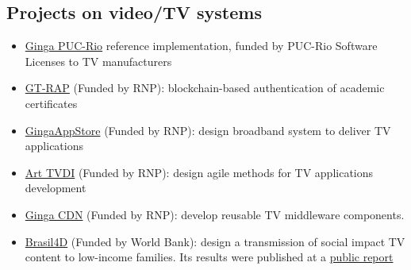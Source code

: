 \documentclass[10pt,a4paper,sans,colorlinks]{moderncv}
\begin{document}
  \subsection{Projects on video/TV systems}
    \begin{itemize}[mynosep]
      \item \href{https://github.com/TeleMidia/ginga}{Ginga PUC-Rio} reference implementation, funded by PUC-Rio Software Licenses to TV manufacturers
      \item \href{http://wrnp.rnp.br/sites/wrnp2017/files/02_wrnp2017_poster_gt-sap_design.pdf}{GT-RAP} (Funded by RNP): blockchain-based authentication of academic certificates
      \item \href{http://www.redetic.rnp.br/ctic/2019/01/29/ginga-appstore/}{GingaAppStore} (Funded by RNP): design broadband system to deliver TV applications
      \item \href{http://www.redetic.rnp.br/ctic/2019/01/29/arttvdi/}{Art TVDI} (Funded by RNP): design agile methods for TV applications development
      \item \href{http://www.redetic.rnp.br/ctic/2019/01/29/gingarap-gingafrevo/}{Ginga CDN} (Funded by RNP): develop reusable TV middleware components.
      \item \href{http://www.ebc.com.br/brasil-4d}{Brasil4D} (Funded by World Bank): design a transmission of social impact TV content to low-income families. Its results were published at a \href{http://documents.worldbank.org/curated/en/232621468230956108/pdf/809560WP0PORTU0Box0379824B00PUBLIC0.pdf}{public report}
    \end{itemize}
\end{document}
